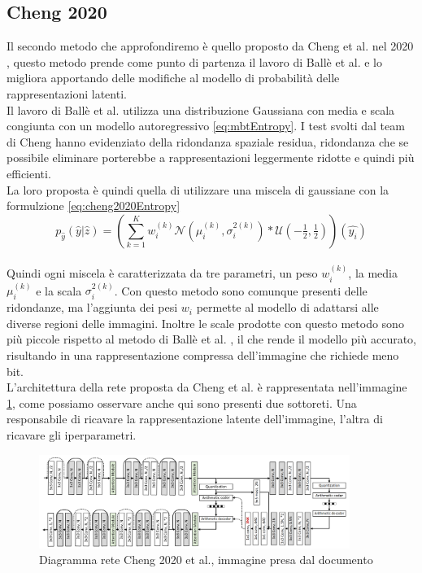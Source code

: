 \subsection{Cheng 2020}
Il secondo metodo che approfondiremo è quello proposto da Cheng et al. nel 2020 \cite{cheng2020learned}, questo metodo prende come punto di partenza il lavoro di Ballè et al. \cite{minnen2018joint} e lo migliora apportando delle modifiche al modello di probabilità delle rappresentazioni latenti.\\
Il lavoro di Ballè et al. \cite{minnen2018joint} utilizza una distribuzione Gaussiana con media e scala congiunta con un modello autoregressivo \ref{eq:mbtEntropy}. I test svolti dal team di Cheng hanno evidenziato della ridondanza spaziale residua, ridondanza che se possibile eliminare porterebbe a rappresentazioni leggermente ridotte e quindi più efficienti.\\
La loro proposta è quindi quella di utilizzare una miscela di gaussiane con la formulzione \ref{eq:cheng2020Entropy}
\begin{equation}\label{eq:cheng2020Entropy}
    p_{\hat{y}}(\hat{y}|\hat{z}) = (\sum_{k=1}^{K} w_{i}^{(k)} \mathcal{N}(\mu_{i}^{(k)},\sigma_{i}^{2(k)})*\mathcal{U}(-\tfrac{1}{2},\tfrac{1}{2}))(\hat{y_{i}})
\end{equation}\\
Quindi ogni miscela è caratterizzata da tre parametri, un peso $w_{i}^{(k)}$, la media $\mu_{i}^{(k)}$ e la scala $\sigma_{i}^{2(k)}$.
Con questo metodo sono comunque presenti delle ridondanze, ma l’aggiunta dei pesi $w_{i}$ permette al modello di adattarsi alle diverse regioni delle immagini. Inoltre le scale prodotte con questo metodo sono più piccole rispetto al metodo di Ballè et al. \cite{minnen2018joint}, il che rende il modello più accurato, risultando in una rappresentazione compressa dell’immagine che richiede meno bit.\\
L’architettura della rete proposta da Cheng et al. \cite{cheng2020learned} è rappresentata nell’immagine \ref{fig:cheng2020Network}, come possiamo osservare anche qui sono presenti due sottoreti. Una responsabile di ricavare la rappresentazione latente dell’immagine, l’altra di ricavare gli iperparametri.\\
\begin{figure}[!h]
    \centering
    \includegraphics[width=0.9\textwidth]{Immagini/Cheng2020_Rete.png}
    \caption{Diagramma rete Cheng 2020 et al., immagine presa dal documento \cite{cheng2020learned}}
    \label{fig:cheng2020Network}
\end{figure}\\
